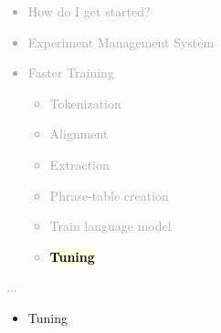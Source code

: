 \documentclass[landscape]{uedslides2C}
\newcommand{\currenttopic}[1]{\colorbox{lightyellow}{\textcolor{black}{\bf #1}}}
\begin{document}

\vspace{-5mm}
\textcolor{darkgrey}{
\begin{itemize} \itemsep -1mm
\item {How do I get started?}
\item {Experiment Management System}
\item {Faster Training}
  \begin{itemize}
  \item {Tokenization}
  \item Alignment
  \item Extraction
  \item Phrase-table creation
  \item Train language model
  \item \currenttopic{Tuning}
  \end{itemize}
\end{itemize}
...
}



\begin{itemize} \itemsep -1mm

\item {Tuning}

\end{itemize}


\end{document}
